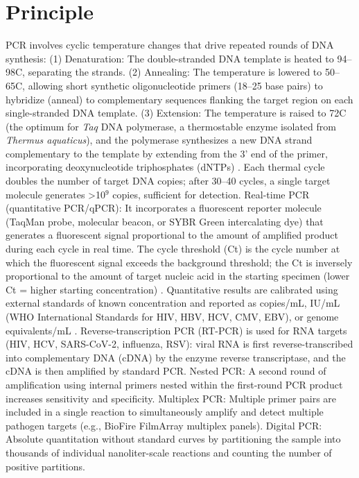 \section*{Principle}
PCR involves cyclic temperature changes that drive repeated rounds of DNA synthesis: (1) Denaturation: The double-stranded DNA template is heated to 94--98\textdegree{}C, separating the strands. (2) Annealing: The temperature is lowered to 50--65\textdegree{}C, allowing short synthetic oligonucleotide primers (18--25 base pairs) to hybridize (anneal) to complementary sequences flanking the target region on each single-stranded DNA template. (3) Extension: The temperature is raised to 72\textdegree{}C (the optimum for \textit{Taq} DNA polymerase, a thermostable enzyme isolated from \textit{Thermus aquaticus}), and the polymerase synthesizes a new DNA strand complementary to the template by extending from the 3' end of the primer, incorporating deoxynucleotide triphosphates (dNTPs) \cite{saiki1988primer}. Each thermal cycle doubles the number of target DNA copies; after 30--40 cycles, a single target molecule generates >10$^9$ copies, sufficient for detection. Real-time PCR (quantitative PCR/qPCR): It incorporates a fluorescent reporter molecule (TaqMan probe, molecular beacon, or SYBR Green intercalating dye) that generates a fluorescent signal proportional to the amount of amplified product during each cycle in real time. The cycle threshold (Ct) is the cycle number at which the fluorescent signal exceeds the background threshold; the Ct is inversely proportional to the amount of target nucleic acid in the starting specimen (lower Ct = higher starting concentration) \cite{espy2006realtime}. Quantitative results are calibrated using external standards of known concentration and reported as copies/mL, IU/mL (WHO International Standards for HIV, HBV, HCV, CMV, EBV), or genome equivalents/mL \cite{bustin2009miqe}. Reverse-transcription PCR (RT-PCR) is used for RNA targets (HIV, HCV, SARS-CoV-2, influenza, RSV): viral RNA is first reverse-transcribed into complementary DNA (cDNA) by the enzyme reverse transcriptase, and the cDNA is then amplified by standard PCR. Nested PCR: A second round of amplification using internal primers nested within the first-round PCR product increases sensitivity and specificity. Multiplex PCR: Multiple primer pairs are included in a single reaction to simultaneously amplify and detect multiple pathogen targets (e.g., BioFire FilmArray multiplex panels). Digital PCR: Absolute quantitation without standard curves by partitioning the sample into thousands of individual nanoliter-scale reactions and counting the number of positive partitions.

